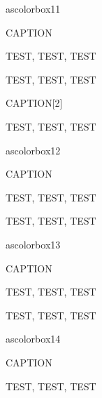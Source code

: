 ascolorbox11

\begin{ascolorbox11}{CAPTION}

TEST, TEST, TEST

\end{ascolorbox11}

\begin{ascolorbox11}{}

TEST, TEST, TEST

\end{ascolorbox11}

\begin{ascolorbox11}{CAPTION}[2]

TEST, TEST, TEST

\end{ascolorbox11}

ascolorbox12

\begin{ascolorbox12}{CAPTION}

TEST, TEST, TEST

\end{ascolorbox12}

\begin{ascolorbox12}{}

TEST, TEST, TEST

\end{ascolorbox12}

ascolorbox13

\begin{ascolorbox13}{CAPTION}

TEST, TEST, TEST

\end{ascolorbox13}

\begin{ascolorbox13}{}

TEST, TEST, TEST

\end{ascolorbox13}

ascolorbox14

\begin{ascolorbox14}{CAPTION}

TEST, TEST, TEST

\end{ascolorbox14}

